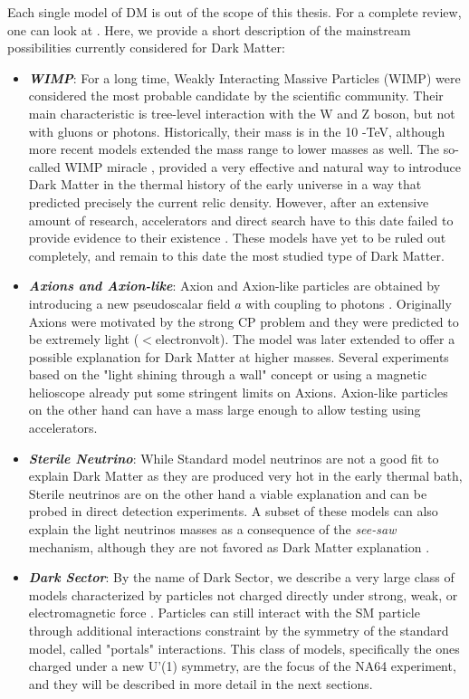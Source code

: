 Each single model of DM is out of the scope of this thesis. For a complete review, one can look at \cite{battaglieri2017cosmic,Profumo:2019ujg,HAMBYE2020135553,alex2016dark,review-particle-physics,Feng:2010gw}. Here, we provide a short description of the mainstream possibilities currently considered for Dark Matter:
\begin{itemize}
\item \textbf{\textit{WIMP}}: For a long time, Weakly Interacting Massive Particles (WIMP) were considered the most probable candidate by the scientific community. Their main characteristic is tree-level interaction with the W and Z boson, but not with gluons or photons. Historically, their mass is in the 10 \gev-\si{\tera\electronvolt}, although more recent models extended the mass range to lower masses as well. The so-called WIMP miracle \cite{Chang:2013oia}, provided a very effective and natural way to introduce Dark Matter in the thermal history of the early universe in a way that predicted precisely the current relic density. However, after an extensive amount of research, accelerators and direct search have to this date failed to provide evidence to their existence \cite{Arcadi:2017kky}. These models have yet to be ruled out completely, and remain to this date the most studied type of Dark Matter.
\item \textbf{\textit{Axions and Axion-like}}: Axion and Axion-like particles are obtained by introducing a new pseudoscalar field $a$ with coupling to photons \cite{Marsh:2015xka}. Originally Axions were motivated by the strong CP problem and they were predicted to be extremely light ($<$\si{electronvolt}). The model was later extended to offer a possible explanation for Dark Matter at higher masses. Several experiments based on the "light shining through a wall" concept or using a magnetic helioscope \cite{annurev.nucl.56.080805.140513} already put some stringent limits on Axions. Axion-like particles on the other hand can have a mass large enough to allow testing using accelerators.
\item \textbf{\textit{Sterile Neutrino}}: While Standard model neutrinos are not a good fit to explain Dark Matter as they are produced very hot in the early thermal bath, Sterile neutrinos are on the other hand a viable explanation and can be probed in direct detection experiments. A subset of these models can also explain the light neutrinos masses as a consequence of the \textit{see-saw} mechanism, although they are not favored as Dark Matter explanation \cite{Feng:2010gw}. 
\item \textbf{\textit{Dark Sector}}: By the name of Dark Sector, we describe a very large class of models characterized by particles not charged directly under strong, weak, or electromagnetic force \cite{alex2016dark}. Particles can still interact with the SM particle through additional interactions constraint by the symmetry of the standard model, called "portals" interactions. This class of models, specifically the ones charged under a new U'(1) symmetry, are the focus of the NA64 experiment, and they will be described in more detail in the next sections.
\end{itemize}

